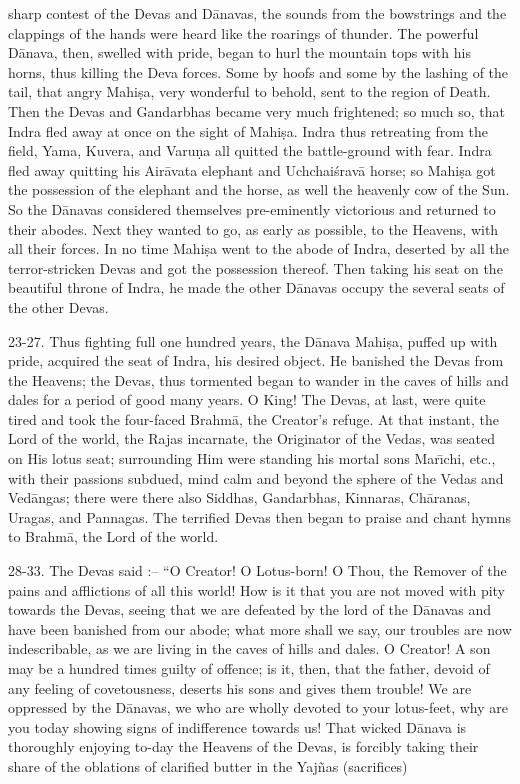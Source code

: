 sharp contest of the Devas and D\=anavas, the sounds from the bowstrings and the clappings of the hands were heard like the roarings of thunder. The powerful D\=anava, then, swelled with pride, began to hurl the mountain tops with his horns, thus killing the Deva forces. Some by hoofs and some by the lashing of the tail, that angry Mahi\d{s}a, very wonderful to behold, sent to the region of Death. Then the Devas and Gandarbhas became very much frightened; so much so, that Indra fled away at once on the sight of Mahi\d{s}a. Indra thus retreating from the field, Yama, Kuvera, and Varu\d{n}a all quitted the battle-ground with fear. Indra fled away quitting his Air\=avata elephant and Uchchai\'srav\=a horse; so Mahi\d{s}a got the possession of the elephant and the horse, as well the heavenly cow of the Sun. So the D\=anavas considered themselves pre-eminently victorious and returned to their abodes. Next they wanted to go, as early as possible, to the Heavens, with all their forces. In no time Mahi\d{s}a went to the abode of Indra, deserted by all the terror-stricken Devas and got the possession thereof. Then taking his seat on the beautiful throne of Indra, he made the other D\=anavas occupy the several seats of the other Devas.

23-27. Thus fighting full one hundred years, the D\=anava Mahi\d{s}a, puffed up with pride, acquired the seat of Indra, his desired object. He banished the Devas from the Heavens; the Devas, thus tormented began to wander in the caves of hills and dales for a period of good many years. O King! The Devas, at last, were quite tired and took the four-faced Brahm\=a, the Creator's refuge. At that instant, the Lord of the world, the Rajas incarnate, the Originator of the Vedas, was seated on His lotus seat; surrounding Him were standing his mortal sons Mar\={\i}chi, etc., with their passions subdued, mind calm and beyond the sphere of the Vedas and Ved\=angas; there were there also Siddhas, Gandarbhas, Kinnaras, Ch\=aranas, Uragas, and Pannagas. The terrified Devas then began to praise and chant hymns to Brahm\=a, the Lord of the world.

28-33. The Devas said :-- ``O Creator! O Lotus-born! O Thou, the Remover of the pains and afflictions of all this world! How is it that you are not moved with pity towards the Devas, seeing that we are defeated by the lord of the D\=anavas and have been banished from our abode; what more shall we say, our troubles are now indescribable, as we are living in the caves of hills and dales. O Creator! A son may be a hundred times guilty of offence; is it, then, that the father, devoid of any feeling of covetousness, deserts his sons and gives them trouble! We are oppressed by the D\=anavas, we who are wholly devoted to your lotus-feet, why are you today showing signs of indifference towards us! That wicked D\=anava is thoroughly enjoying to-day the Heavens of the Devas, is forcibly taking their share of the oblations of clarified butter in the Yaj\~nas (sacrifices)

